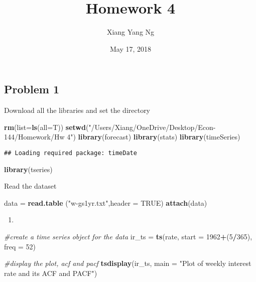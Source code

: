 \documentclass[]{article}
\title{Homework 4}
\author{Xiang Yang Ng}
\date{May 17, 2018}
\newenvironment{Shaded}{\begin{snugshade}}{\end{snugshade}}
\newcommand{\KeywordTok}[1]{\textcolor[rgb]{0.13,0.29,0.53}{\textbf{#1}}}
\newcommand{\DataTypeTok}[1]{\textcolor[rgb]{0.13,0.29,0.53}{#1}}
\newcommand{\DecValTok}[1]{\textcolor[rgb]{0.00,0.00,0.81}{#1}}
\newcommand{\StringTok}[1]{\textcolor[rgb]{0.31,0.60,0.02}{#1}}
\newcommand{\CommentTok}[1]{\textcolor[rgb]{0.56,0.35,0.01}{\textit{#1}}}
\newcommand{\OtherTok}[1]{\textcolor[rgb]{0.56,0.35,0.01}{#1}}
\newcommand{\OperatorTok}[1]{\textcolor[rgb]{0.81,0.36,0.00}{\textbf{#1}}}
\newcommand{\NormalTok}[1]{#1}
\begin{document}
\maketitle

\subsection{Problem 1}\label{problem-1}

Download all the libraries and set the directory

\begin{Shaded}
\begin{Highlighting}[]
\KeywordTok{rm}\NormalTok{(}\DataTypeTok{list=}\KeywordTok{ls}\NormalTok{(}\DataTypeTok{all=}\NormalTok{T))}
\KeywordTok{setwd}\NormalTok{(}\StringTok{"/Users/Xiang/OneDrive/Desktop/Econ-144/Homework/Hw 4"}\NormalTok{)}
\KeywordTok{library}\NormalTok{(forecast)}
\KeywordTok{library}\NormalTok{(stats)}
\KeywordTok{library}\NormalTok{(timeSeries)}
\end{Highlighting}
\end{Shaded}

\begin{verbatim}
## Loading required package: timeDate
\end{verbatim}

\begin{Shaded}
\begin{Highlighting}[]
\KeywordTok{library}\NormalTok{(tseries)}
\end{Highlighting}
\end{Shaded}

Read the dataset

\begin{Shaded}
\begin{Highlighting}[]
\NormalTok{data =}\StringTok{ }\KeywordTok{read.table}\NormalTok{ (}\StringTok{"w-gs1yr.txt"}\NormalTok{,}\DataTypeTok{header =} \OtherTok{TRUE}\NormalTok{)}
\KeywordTok{attach}\NormalTok{(data)}
\end{Highlighting}
\end{Shaded}

\begin{enumerate}
\def\labelenumi{\alph{enumi})}
\item
\end{enumerate}

\begin{Shaded}
\begin{Highlighting}[]
\CommentTok{#create a time series object for the data}
\NormalTok{ir_ts =}\StringTok{ }\KeywordTok{ts}\NormalTok{(rate, }\DataTypeTok{start =} \DecValTok{1962}\OperatorTok{+}\NormalTok{(}\DecValTok{5}\OperatorTok{/}\DecValTok{365}\NormalTok{), }\DataTypeTok{freq =} \DecValTok{52}\NormalTok{)}

\CommentTok{#display the plot, acf and pacf}
\KeywordTok{tsdisplay}\NormalTok{(ir_ts, }\DataTypeTok{main =} \StringTok{"Plot of weekly interest rate and its ACF and PACF"}\NormalTok{)}
\end{Highlighting}
\end{Shaded}
\end{document}
